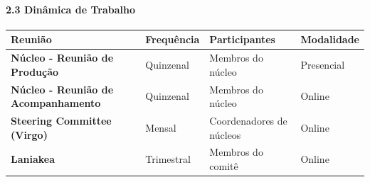 \paragraph{2.3 Dinâmica de Trabalho}

\bigskip\noindent
\begin{tabular}{p{}p{}p{}p{}}
\toprule
Reunião & Frequência & Participantes & Modalidade \\
\hline
\textbf{Núcleo - Reunião de Produção} & Quinzenal & Membros do núcleo & Presencial \\
\textbf{Núcleo - Reunião de Acompanhamento} & Quinzenal & Membros do núcleo & Online \\
\textbf{Steering Committee (Virgo)} & Mensal & Coordenadores de núcleos & Online \\
\textbf{Laniakea} & Trimestral & Membros do comitê & Online \\
\bottomrule
\end{tabular}

\bigskip